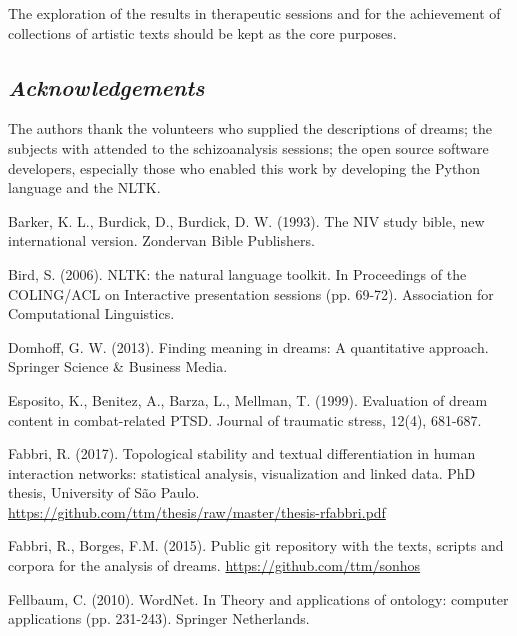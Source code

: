 \documentclass[12pt,fleqn]{article}
\begin{document}
The exploration of the results in therapeutic sessions and for the achievement of collections of
artistic texts should be kept as the core purposes.

\subsection*{\textit{Acknowledgements}}
The authors thank the volunteers who supplied the descriptions of dreams;
the subjects with attended to the schizoanalysis sessions;
the open source software developers, especially those who enabled this work by developing
the Python language and the NLTK.

\begin{thebibliography}{99}
\fontsize{11}{0}\selectfont
{}
Barker, K. L., Burdick, D., Burdick, D. W. (1993). The NIV study bible, new international version. Zondervan Bible Publishers.

Bird, S. (2006). NLTK: the natural language toolkit. In Proceedings of the COLING/ACL on Interactive presentation sessions (pp. 69-72). Association for Computational Linguistics.

Domhoff, G. W. (2013). Finding meaning in dreams: A quantitative approach. Springer Science \& Business Media.

Esposito, K., Benitez, A., Barza, L., Mellman, T. (1999). Evaluation of dream content in combat-related PTSD. Journal of traumatic stress, 12(4), 681-687.

Fabbri, R. (2017). Topological stability and textual differentiation in human interaction networks:
		statistical analysis, visualization and linked data. PhD thesis, University of São Paulo.
		\url{https://github.com/ttm/thesis/raw/master/thesis-rfabbri.pdf}

Fabbri, R., Borges, F.M. (2015). Public git repository with the texts, scripts and corpora for the analysis of dreams.
		\url{https://github.com/ttm/sonhos}

Fellbaum, C. (2010). WordNet. In Theory and applications of ontology: computer applications (pp. 231-243). Springer Netherlands.
\end{thebibliography}





\end{document}
